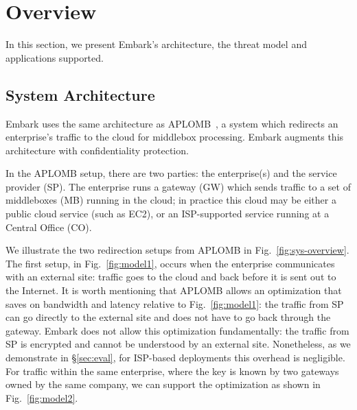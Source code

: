 \documentclass[letterpaper,twocolumn,10pt]{article}
\newcommand{\sys}{Embark\xspace} %
\begin{document}
\section{Overview}\label{sec:overview}

In this section, we present \sys's architecture, the threat model and applications supported.


\subsection{System Architecture}

\sys uses the same  architecture as APLOMB~\cite{aplomb}, a system which redirects an enterprise's traffic to the cloud for middlebox processing. \sys augments this architecture with confidentiality protection.


In the APLOMB setup, there are two parties: the enterprise(s) and the service provider (SP).
The enterprise runs a gateway (GW) which sends traffic to a set of middleboxes (MB) running in the cloud; in practice this cloud may be either a public cloud service (such as EC2), or an ISP-supported service running at a Central Office (CO).

We illustrate the two redirection setups from APLOMB in Fig.~\ref{fig:sys-overview}.  The first setup, in Fig.~\ref{fig:model1},  occurs when the enterprise communicates with an external site: traffic goes to the cloud and back before it is sent out to the Internet. 
It is worth mentioning that APLOMB allows an optimization that saves on bandwidth and latency relative to Fig.~\ref{fig:model1}: the traffic from SP can go directly to the external site and does not have to go back through the gateway. \sys does not allow this optimization fundamentally: the traffic from SP is encrypted and cannot be understood by an external site. 
Nonetheless, as we demonstrate in \S\ref{sec:eval}, for ISP-based deployments this overhead is negligible.
For traffic within the same enterprise, where the key is known by two gateways owned by the same company, we can support the optimization as shown in Fig.~\ref{fig:model2}.
\end{document}

